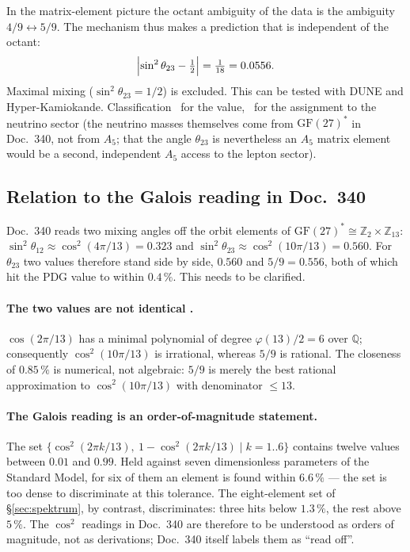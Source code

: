 In the matrix-element picture the octant ambiguity of the data is the
ambiguity $4/9\leftrightarrow 5/9$. The mechanism thus makes a prediction
that is independent of the octant:
\[
  \Bigl|\sin^2\theta_{23} - \tfrac12\Bigr| = \tfrac1{18} = 0.0556 .
\]
Maximal mixing ($\sin^2\theta_{23} = 1/2$) is excluded. This can be tested
with DUNE and Hyper-Kamiokande. Classification \KM~for the value, \SM~for
the assignment to the neutrino sector (the neutrino masses themselves come
from $\mathrm{GF}(27)^*$ in Doc.~340, not from $A_5$; that the angle
$\theta_{23}$ is nevertheless an $A_5$ matrix element would be a second,
independent $A_5$ access to the lepton sector).

\subsection{Relation to the Galois reading in Doc.~340}
\label{sec:340}

Doc.~340 reads two mixing angles off the orbit elements of
$\mathrm{GF}(27)^*\cong\mathbb Z_2\times\mathbb Z_{13}$:
$\sin^2\theta_{12}\approx\cos^2(4\pi/13) = 0.323$ and
$\sin^2\theta_{23}\approx\cos^2(10\pi/13) = 0.560$. For $\theta_{23}$ two
values therefore stand side by side, $0.560$ and $5/9 = 0.556$, both of which
hit the PDG value to within $0.4\,\%$. This needs to be clarified.

\paragraph{The two values are not identical \BM.}
$\cos(2\pi/13)$ has a minimal polynomial of degree $\varphi(13)/2 = 6$ over
$\mathbb Q$; consequently $\cos^2(10\pi/13)$ is irrational, whereas $5/9$ is
rational. The closeness of $0.85\,\%$ is numerical, not algebraic: $5/9$ is
merely the best rational approximation to $\cos^2(10\pi/13)$ with denominator
$\le 13$.

\paragraph{The Galois reading is an order-of-magnitude statement.}
The set $\{\cos^2(2\pi k/13),\ 1-\cos^2(2\pi k/13)\mid k=1..6\}$ contains
twelve values between $0.01$ and $0.99$. Held against seven dimensionless
parameters of the Standard Model, for six of them an element is found within
$6.6\,\%$ --- the set is too dense to discriminate at this tolerance. The
eight-element set of §\ref{sec:spektrum}, by contrast, discriminates: three
hits below $1.3\,\%$, the rest above $5\,\%$. The $\cos^2$ readings in
Doc.~340 are therefore to be understood as orders of magnitude, not as
derivations; Doc.~340 itself labels them as ``read off''.

